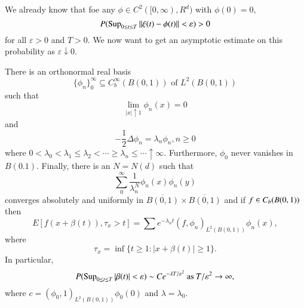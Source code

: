 We already know that foe any $\phi \in C^2 ([0, \infty), R^d)$ with
  $\phi(0) =0$, 
$$
P(\operatorname{Sup}_{0 \le t \le T} || \xi(t) - \phi(t) || < \varepsilon)> 0 
$$
for all $\varepsilon > 0$ and $T >0$. We now want to get an asymptotic
estimate on this probability as $\varepsilon \downarrow 0$. 


\setcounter{lemma}{1}
\begin{lemma}\label{chap2:lem5.2}%
There is an orthonormal real basis  
$$
\{ \phi_n\}^\infty_0 \subseteq C^\infty_b(B(0,1)) \text{ of } L^2
(B(0,1)) 
$$
such that 
$$
\lim_{|x| \uparrow 1} \phi_n (x) =0 
$$
and 
$$
- \frac{1}{2}\Delta \phi_n = \lambda_n \phi_n, n \ge 0 
$$
where $0  < \lambda_0 < \lambda_1 \le \lambda_2 < \cdots \ge \lambda_n
\le \cdots \uparrow \infty$. Furthermore, $\phi_0$ never vanishes in
$B(0.1)$. Finally, there is an $N=N(d)$ such that  
$$
\sum_0^{\infty} \frac{1}{\lambda_n^N} \phi_n (x) \phi_n(y)
$$
converges absolutely and uniformly in $\overline{B(0,1)} \times
\overline{B(0,1)}$ and if  $f \in C_b\break (B(0,1))$ then  
\begin{equation*}
E[f(x+ \beta(t)), \tau_x > t ]= \sum e^{-\lambda_n t}(f,
\phi_n)_{L^2(B(0,1))} \phi_n(x), \tag{5.3}\label{chap2:eq5.3} 
\end{equation*}\pageoriginale
where
$$
\tau_x=  \inf\{ t \ge 1: |x+ \beta(t)| \ge 1 \}. 
$$
In particular,
$$
P(\operatorname{Sup}_{0 \le t \le T}|\beta(t)| < \varepsilon)\sim C e^{-\lambda T/
  \varepsilon^2} \text{ as } T/ \varepsilon^2 \to \infty, 
$$
where $ c=  (\phi_0, 1)_{L^2 (B(0,1))} \phi_0(0) $ and $\lambda=
\lambda_0$. 
\end{lemma}


